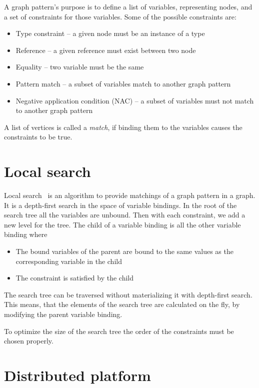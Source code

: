 A graph pattern's purpose is to define a list of variables, representing nodes, and a set of constraints for those variables. Some of the possible constraints are:
\begin{itemize}
	\item Type constraint -- a given node must be an instance of a type
	\item Reference -- a given reference must exist between two node
	\item Equality -- two variable must be the same
	\item Pattern match -- a subset of variables match to another graph pattern
	\item Negative application condition (NAC) -- a subset of variables must not match to another graph pattern
\end{itemize}
A list of vertices is called a \emph{match}, if binding them to the variables causes the constraints to be true.

\section{Local search}

Local search~\cite{bur-marton-msc} is an algorithm to provide matchings of a graph pattern in a graph. It is a depth-first search in the space of variable bindings. In the root of the search tree all the variables are unbound. Then with each constraint, we add a new level for the tree. The child of a variable binding is all the other variable binding where 
\begin{itemize}
	\item The bound variables of the parent are bound to the same values as the corresponding variable in the child
	\item The constraint is satisfied by the child
\end{itemize}

The search tree can be traversed without materializing it with depth-first search. This means, that the elements of the search tree are calculated on the fly, by modifying the parent variable binding.

To optimize the size of the search tree the order of the constraints must be chosen properly. 

\section{Distributed platform}


